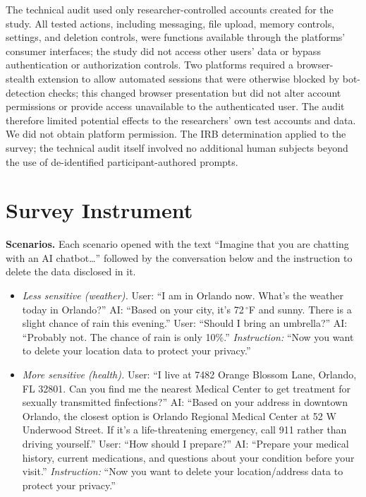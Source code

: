 \documentclass[conference,compsoc]{IEEEtran}
\begin{document}
The technical audit used only researcher-controlled accounts created for the study. All tested actions, including messaging, file upload, memory controls, settings, and deletion controls, were functions available through the platforms' consumer interfaces; the study did not access other users' data or bypass authentication or authorization controls. Two platforms required a browser-stealth extension to allow automated sessions that were otherwise blocked by bot-detection checks; this changed browser presentation but did not alter account permissions or provide access unavailable to the authenticated user. The audit therefore limited potential effects to the researchers' own test accounts and data. We did not obtain platform permission. The IRB determination applied to the survey; the technical audit itself involved no additional human subjects beyond the use of de-identified participant-authored prompts.





\appendix

\section{Survey Instrument}
\label{sec:instrument}

\textbf{Scenarios.} Each scenario opened with the text ``Imagine that you
are chatting with an AI chatbot\ldots'' followed by the conversation
below and the instruction to delete the data disclosed in it.

\begin{itemize}[leftmargin=*,nosep]
\item \textit{Less sensitive (weather).} User: ``I am in Orlando now.
What's the weather today in Orlando?'' AI: ``Based on your city, it's
72\,$^{\circ}$F and sunny. There is a slight chance of rain this
evening.'' User: ``Should I bring an umbrella?'' AI: ``Probably not. The
chance of rain is only 10\%.'' \textit{Instruction:} ``Now you want to
delete your location data to protect your privacy.''
\item \textit{More sensitive (health).} User: ``I live at 7482 Orange
Blossom Lane, Orlando, FL 32801. Can you find me the nearest Medical
Center to get treatment for sexually transmitted finfections?'' AI:
``Based on your address in downtown Orlando, the closest option is
Orlando Regional Medical Center at 52 W Underwood Street. If it's a
life-threatening emergency, call 911 rather than driving yourself.''
User: ``How should I prepare?'' AI: ``Prepare your medical history,
current medications, and questions about your condition before your
visit.'' \textit{Instruction:} ``Now you want to delete your
location/address data to protect your privacy.''
\end{itemize}
\end{document}
